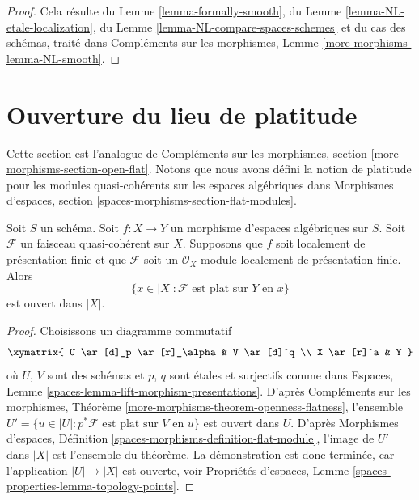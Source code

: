 \begin{proof}
Cela résulte du
Lemme \ref{lemma-formally-smooth}, du
Lemme \ref{lemma-NL-etale-localization}, du
Lemme \ref{lemma-NL-compare-spaces-schemes}
et du cas des schémas, traité dans
Compléments sur les morphismes, Lemme \ref{more-morphisms-lemma-NL-smooth}.
\end{proof}











\section{Ouverture du lieu de platitude}
\label{section-open-flat}

\noindent
Cette section est l'analogue de
Compléments sur les morphismes, section \ref{more-morphisms-section-open-flat}.
Notons que nous avons défini la notion de platitude pour les modules
quasi-cohérents sur les espaces algébriques dans
Morphismes d'espaces, section \ref{spaces-morphisms-section-flat-modules}.

\begin{theorem}
\label{theorem-openness-flatness}
Soit $S$ un schéma.
Soit $f : X \to Y$ un morphisme d'espaces algébriques sur $S$.
Soit $\mathcal{F}$ un faisceau quasi-cohérent sur $X$.
Supposons que $f$ soit localement de présentation finie et que
$\mathcal{F}$ soit un $\mathcal{O}_X$-module
localement de présentation finie. Alors
$$
\{x \in |X| : \mathcal{F}\text{ est plat sur }Y\text{ en }x\}
$$
est ouvert dans $|X|$.
\end{theorem}

\begin{proof}
Choisissons un diagramme commutatif
$$
\xymatrix{
U \ar[d]_p \ar[r]_\alpha &
V \ar[d]^q \\
X \ar[r]^a & Y
}
$$
où $U$, $V$ sont des schémas et $p$, $q$ sont étales et surjectifs comme dans
Espaces, Lemme \ref{spaces-lemma-lift-morphism-presentations}.
D'après
Compléments sur les morphismes, Théorème \ref{more-morphisms-theorem-openness-flatness},
l'ensemble
$U' = \{u \in |U| : p^*\mathcal{F}\text{ est plat sur }V\text{ en }u\}$
est ouvert dans $U$. D'après
Morphismes d'espaces, Définition \ref{spaces-morphisms-definition-flat-module},
l'image de $U'$ dans $|X|$ est l'ensemble
du théorème. La démonstration est donc terminée, car l'application $|U| \to |X|$ est
ouverte, voir
Propriétés d'espaces, Lemme \ref{spaces-properties-lemma-topology-points}.
\end{proof}

